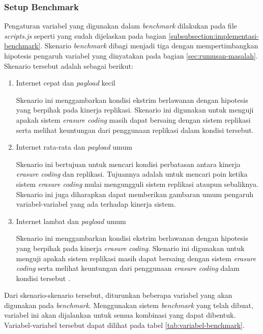 \subsubsection{Setup Benchmark}
\label{subsubsection:setup-benchmark}

Pengaturan variabel yang digunakan dalam \textit{benchmark} dilakukan pada file \textit{scripts.js} seperti yang sudah dijelaskan pada bagian \ref{subsubsection:implementasi-benchmark}. Skenario \textit{benchmark} dibagi menjadi tiga dengan mempertimbangkan hipotesis pengaruh variabel yang dinyatakan pada bagian \ref{sec:rumusan-masalah}. Skenario tersebut adalah sebagai berikut:

\begin{enumerate}
  \item Internet cepat dan \textit{payload} kecil
  
  Skenario ini menggambarkan kondisi ekstrim berlawanan dengan hipotesis yang berpihak pada kinerja replikasi. Skenario ini digunakan untuk menguji apakah sistem \textit{erasure coding} masih dapat bersaing dengan sistem replikasi serta melihat keuntungan dari penggunaan replikasi dalam kondisi tersebut. 

  \item Internet rata-rata dan \textit{payload} umum
  
  Skenario ini bertujuan untuk mencari kondisi perbatasan antara kinerja \textit{erasure coding} dan replikasi. Tujuannya adalah untuk mencari poin ketika sistem \textit{erasure coding} mulai mengungguli sistem replikasi ataupun sebaliknya. Skenario ini juga diharapkan dapat memberikan gambaran umum pengaruh variabel-variabel yang ada terhadap kinerja sistem.
  
  \item Internet lambat dan \textit{payload} umum
  
  Skenario ini menggambarkan kondisi ekstrim berlawanan dengan hipotesis yang berpihak pada kinerja \textit{erasure coding}. Skenario ini digunakan untuk menguji apakah sistem replikasi masih dapat bersaing dengan sistem \textit{erasure coding} serta melihat keuntungan dari penggunaan \textit{erasure coding} dalam kondisi tersebut .

\end{enumerate}

Dari skenario-skenario tersebut, diturunkan beberapa variabel yang akan digunakan pada \textit{benchmark}. Menggunakan sistem \textit{benchmark} yang telah dibuat, variabel ini akan dijalankan untuk semua kombinasi yang dapat dibentuk. Variabel-variabel tersebut dapat dilihat pada tabel \ref{tab:variabel-benchmark}.

